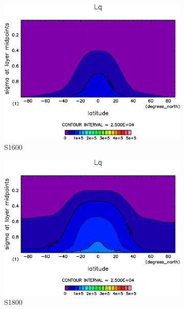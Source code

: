 \documentclass[body]{subfiles}
\begin{document}
\begin{figure}[t]
\begin{subfigure}{.4\textwidth}
		\includegraphics[width=\textwidth]{S1600/Lq,time=3650:4015-crop-rotate.pdf}
		\caption{S1600}\label{LqS1600}
	\end{subfigure}
	\begin{subfigure}{.4\textwidth}
		\centering
		\includegraphics[width=\textwidth]{S1800/Lq,time=3650:4015-crop-rotate.pdf}
		\caption{S1800}\label{LqS1800}
	\end{subfigure}
	\begin{subfigure}{.4\textwidth}
		\centering

\end{subfigure}
\end{figure}
\end{document}
